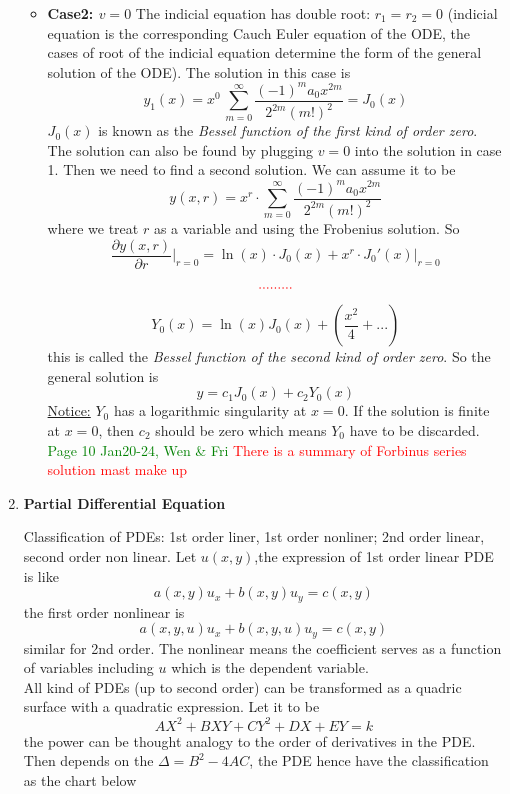 \documentclass[10pt]{article}
\newenvironment{changemargin}[2]{%
  \begin{list}{}{%
    \setlength{\topsep}{0pt}%
    \setlength{\leftmargin}{#1}%
    \setlength{\rightmargin}{#2}%
    \setlength{\listparindent}{\parindent}%
    \setlength{\itemindent}{\parindent}%
    \setlength{\parsep}{\parskip}%
  }%
  \item[]}{\end{list}}
\begin{document}
\begin{changemargin}{-0.125in}{0in}
\begin{enumerate}
\begin{itemize}
	            \item \textbf{Case2: $v = 0$} The indicial equation has double root: $r_1 = r_2 = 0$ (indicial equation is the corresponding Cauch Euler equation of the ODE, the cases of root of the indicial equation determine the form of the general solution of the ODE). The solution in this case is 
	            \[
	            y_1(x) = x^0\,\sum^\infty_{m=0}\frac{(-1)^m a_0x^{2m}}{2^{2m}(m!)^2} = J_0(x)
	            \]
	            $J_0(x)$ is known as the \textit{Bessel function of the first kind of order zero}. The solution can also be found by plugging $v=0$ into the solution in case 1. Then we need to find a second solution. We can assume it to be 
	            \[
	            y(x,r) = x^r \cdot \sum^\infty_{m=0}\frac{(-1)^m a_0x^{2m}}{2^{2m}(m!)^2}
	            \]
	            where we treat $r$ as a variable and using the Frobenius solution. So 
	            \[
	            \frac{\partial y(x,r)}{\partial r} \bigg|_{r = 0} = \ln (x) \cdot J_0(x) + x^r \cdot J_0'(x)\bigg |_{r = 0}
	            \]
	            \[
	            \textcolor{red}{... ... ...}
	            \]
	            \[
	            Y_0 (x) = \ln(x) J_0(x) + (\frac{x^2}{4} + ...)
	            \]
	            this is called the \textit{Bessel function of the second kind of order zero}. So the general solution is 
	            \[
	            y = c_1 J_0(x) + c_2 Y_0(x)
	            \]
	            \underline{Notice:} $Y_0$ has a logarithmic singularity at $x=0$. If the solution is finite at $x=0$, then $c_2$ should be zero which means $Y_0$ have to be discarded. \textcolor{green}{Page 10 Jan20-24, Wen \& Fri} \textcolor{red}{There is a summary of Forbinus series solution mast make up}
	            \end{itemize}
	            
	            
	            \bigskip
	            
	            \item \textbf{Partial Differential Equation}
	            
	            \medskip
	            
	            Classification of PDEs: 1st order liner, 1st order nonliner; 2nd order linear, second order non linear. Let $u(x,y)$,the expression of 1st order linear PDE is like 
	            \[
	            a(x,y)u_x + b(x,y)u_y = c(x,y)
	            \]
	            the first order nonlinear is 
	            \[
	            a(x,y,u)u_x + b(x,y,u)u_y = c(x,y)
	            \]
	            similar for 2nd order. The nonlinear means the coefficient serves as a function of variables including $u$ which is the dependent variable. \\
	            All kind of PDEs (up to second order) can be transformed as a quadric surface with a quadratic expression. Let it to be 
	            \[
	            AX^2 + BXY + CY^2 + DX + EY = k
	            \]
	            the power can be thought analogy to the order of derivatives in the PDE. Then depends on the $\Delta = B^2 - 4AC$, the PDE hence have the classification as the chart below
	            

\end{enumerate}
\end{changemargin}
\end{document}
